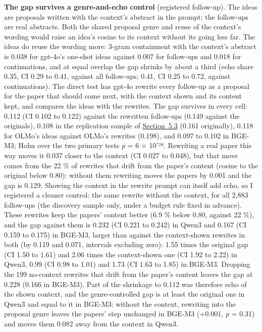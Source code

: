 \documentclass[
  10pt,
]{article}
\begin{document}
\textbf{The gap survives a
genre-and-echo control} (registered
follow-up). The ideas are proposals
written with the context's abstract in
the prompt; the follow-ups are real
abstracts. Both the shared proposal
genre and reuse of the context's wording
would raise an idea's cosine to its
context without its going less far. The
ideas do reuse the wording more: 3-gram
containment with the context's abstract
is 0.038 for gpt-4o's one-shot ideas
against 0.007 for follow-ups and 0.018
for continuations, and at equal overlap
the gap shrinks by about a third (echo
share 0.35, CI 0.29 to 0.41, against all
follow-ups; 0.41, CI 0.25 to 0.72,
against continuations). The direct test
has gpt-4o rewrite every follow-up as a
proposal for the paper that should come
next, with the context shown and its
content kept, and compares the ideas
with the rewrites. The gap survives in
every cell: 0.112 (CI 0.102 to 0.122)
against the rewritten follow-ups (0.149
against the originals), 0.108 in the
replication sample of
\hyperref[sec:5.3]{Section~5.3} (0.161
originally), 0.118 for OLMo's ideas
against OLMo's rewrites (0.198), and
0.097 to 0.102 in BGE-M3; Holm over the
two primary tests \emph{p} = 6 × 10⁻²⁶.
Rewriting a real paper this way moves it
0.037 closer to the context (CI 0.027 to
0.048), but that move comes from the 22
\% of rewrites that drift from the
paper's content (cosine to the original
below 0.80): without them rewriting
moves the papers by 0.001 and the gap is
0.129. Showing the context in the
rewrite prompt can itself add echo, so I
registered a cleaner control: the same
rewrite without the context, for all
2,883 follow-ups (the discovery sample
only, under a budget rule fixed in
advance). These rewrites keep the
papers' content better (6.9 \% below
0.80, against 22 \%), and the gap
against them is 0.232 (CI 0.221 to
0.242) in Qwen3 and 0.167 (CI 0.159 to
0.175) in BGE-M3, larger than against
the context-shown rewrites in both (by
0.119 and 0.071, intervals excluding
zero): 1.55 times the original gap (CI
1.50 to 1.61) and 2.06 times the
context-shown one (CI 1.92 to 2.22) in
Qwen3, 0.99 (CI 0.98 to 1.01) and 1.73
(CI 1.63 to 1.85) in BGE-M3. Dropping
the 199 no-context rewrites that drift
from the paper's content leaves the gap
at 0.228 (0.166 in BGE-M3). Part of the
shrinkage to 0.112 was therefore echo of
the shown context, and the
genre-controlled gap is at least the
original one in Qwen3 and equal to it in
BGE-M3: without the context, rewriting
into the proposal genre leaves the
papers' step unchanged in BGE-M3
(+0.001, \emph{p} = 0.31) and moves them
0.082 away from the context in Qwen3.
\end{document}
